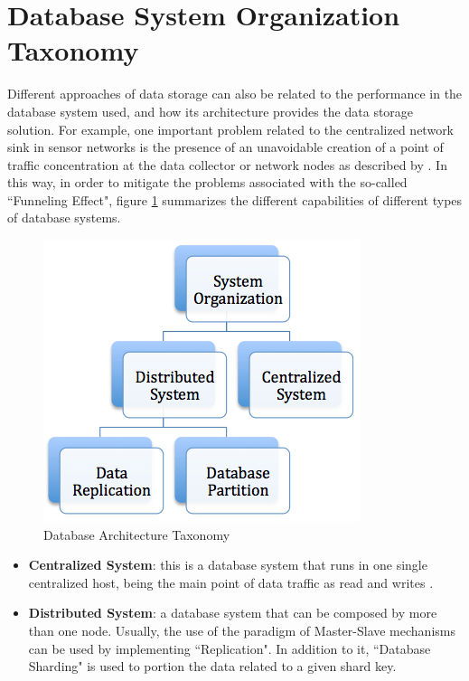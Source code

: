 \section{Database System Organization Taxonomy}

Different approaches of data storage can also be related to the performance in
the database system used, and how its architecture provides the data storage
solution. For example, one important problem related to the centralized
network sink in sensor networks is the presence of an unavoidable creation of a
point of traffic concentration at the data collector or network nodes as
described by \cite{sn-storage02}. In this way, in order to mitigate the
problems associated with the so-called ``Funneling Effect", figure
\ref{fig:taxonomy-database-architecture} summarizes the different capabilities
of different types of database systems.

\begin{figure}[h]
  \centering
  \includegraphics{../diagrams/taxonomy-database-architecture}
  \caption{Database Architecture Taxonomy}
  \label{fig:taxonomy-database-architecture}
\end{figure}

\begin{itemize}
  \item \textbf{Centralized System}: this is a database system that runs in
  one single centralized host, being the main point of data traffic as read
  and writes \cite{sn-intro01}.
  \item \textbf{Distributed System}: a database system that can be composed by
  more than one node. Usually, the use of the paradigm of Master-Slave
  mechanisms can be used by implementing ``Replication". In addition to it,
  ``Database Sharding" is used to portion the data related to a given shard
  key.
\end{itemize}